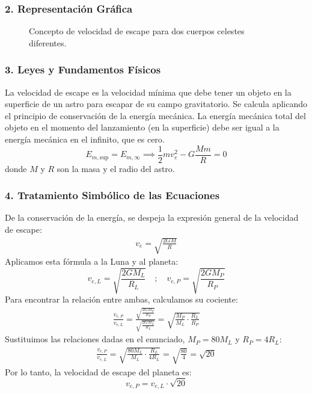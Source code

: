 \subsubsection*{2. Representación Gráfica}
\begin{figure}[H]
    \centering
    \caption{Concepto de velocidad de escape para dos cuerpos celestes diferentes.}
\end{figure}

\subsubsection*{3. Leyes y Fundamentos Físicos}
La velocidad de escape es la velocidad mínima que debe tener un objeto en la superficie de un astro para escapar de su campo gravitatorio. Se calcula aplicando el principio de conservación de la energía mecánica. La energía mecánica total del objeto en el momento del lanzamiento (en la superficie) debe ser igual a la energía mecánica en el infinito, que es cero.
$$ E_{m, \text{sup}} = E_{m, \infty} \implies \frac{1}{2}mv_e^2 - G\frac{Mm}{R} = 0 $$
donde $M$ y $R$ son la masa y el radio del astro.

\subsubsection*{4. Tratamiento Simbólico de las Ecuaciones}
De la conservación de la energía, se despeja la expresión general de la velocidad de escape:
\begin{gather}
    v_e = \sqrt{\frac{2GM}{R}}
\end{gather}
Aplicamos esta fórmula a la Luna y al planeta:
$$ v_{e,L} = \sqrt{\frac{2GM_L}{R_L}} \quad ; \quad v_{e,P} = \sqrt{\frac{2GM_P}{R_P}} $$
Para encontrar la relación entre ambas, calculamos su cociente:
\begin{gather}
    \frac{v_{e,P}}{v_{e,L}} = \frac{\sqrt{\frac{2GM_P}{R_P}}}{\sqrt{\frac{2GM_L}{R_L}}} = \sqrt{\frac{M_P}{M_L} \cdot \frac{R_L}{R_P}}
\end{gather}
Sustituimos las relaciones dadas en el enunciado, $M_P = 80 M_L$ y $R_P = 4 R_L$:
\begin{gather}
    \frac{v_{e,P}}{v_{e,L}} = \sqrt{\frac{80 M_L}{M_L} \cdot \frac{R_L}{4 R_L}} = \sqrt{\frac{80}{4}} = \sqrt{20}
\end{gather}
Por lo tanto, la velocidad de escape del planeta es:
$$ v_{e,P} = v_{e,L} \cdot \sqrt{20} $$

